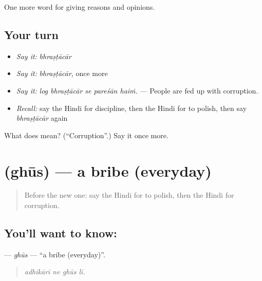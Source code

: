 \begin{grammarlens}[title={What you've built}]
One more word for giving reasons and opinions.
\end{grammarlens}

\subsection*{Your turn}
\begin{itemize}
\raggedright
  \item \emph{Say it:} \emph{bhraṣṭācār}
  \item \emph{Say it:} \emph{bhraṣṭācār}, once more
  \item \emph{Say it:} \emph{log bhraṣṭācār se pareśān haiṁ.} — People are fed up with corruption.
  \item \emph{Recall:} say the Hindi for discipline, then the Hindi for to polish, then say \emph{bhraṣṭācār} again
\end{itemize}

\begin{tcolorbox}[breakable,colback=teal!4,colframe=teal!35!black,title={Before you move on}]
What does  mean? (\textquotedblleft{}Corruption\textquotedblright{}.) Say it once more.
\end{tcolorbox}
\section[\texorpdfstring{\hi{घूस} (ghūs)}{घूस (ghūs)}]{ (ghūs) — a bribe (everyday)}

\label{lesson:HI-C369-ghus}



\begin{quote}
Before the new one: say the Hindi for to polish, then the Hindi for corruption.
\end{quote}

\subsection*{You'll want to know: }
\textbf{} — \emph{ghūs} — \textquotedblleft{}a bribe (everyday)\textquotedblright{}.

\begin{quote}
   
\end{quote}

\begin{quote}
\emph{adhikārī ne ghūs lī.}
\end{quote}

